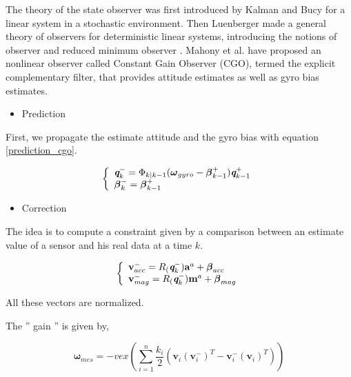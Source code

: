 \documentclass[conference]{IEEEtran}
\begin{document}
The theory of the state observer was first introduced by Kalman and Bucy for a linear system in a stochastic environment. Then Luenberger \cite{david1971introduction} made a general theory of observers for deterministic linear systems, introducing the notions of observer and reduced minimum observer \cite{primbs1996survey}. Mahony et al. \cite{mahony_nonlinear_2008} have proposed an nonlinear observer called Constant Gain Observer (CGO), termed the explicit complementary filter, that provides attitude estimates as well as gyro bias estimates. 

\begin{itemize}
\item Prediction
\end{itemize}

First, we propagate the estimate attitude and the gyro bias with equation \ref{prediction_cgo}.

\begin{equation}
\left\{\begin{array}{l}
\mathbi{q}_{k}^- = \Phi_{k|k-1}(\boldsymbol\omega_{gyro} - \boldsymbol \beta_{k-1}^+)\mathbi{q}_{k-1}^+ \\
\boldsymbol \beta_k^- = \boldsymbol \beta_{k-1}^+
 \end{array}
\right.
\label{prediction_cgo}
\end{equation}


\begin{itemize}
\item Correction
\end{itemize}


The idea is to compute a  constraint  given by a comparison between  an estimate value of a sensor and his real data at a time $k$. 

\begin{equation}
\left\{\begin{array}{l}
\textbf{v}_{acc}^- = R_(\textbf{\em q}_{k}^-)\textbf{a}^a + \boldsymbol  \beta_{acc} \\
\textbf{v}_{mag}^- = R_(\textbf{\em q}_{k}^-)\textbf{m}^a + \boldsymbol  \beta_{mag}
 \end{array}
\right.
\end{equation}

All these vectors are normalized. 

The '' gain '' is given by,

\begin{equation}
\boldsymbol \omega_{mes} = -vex(\sum_{i=1}^n \frac{k_i}{2}(\textbf{v}_i(\textbf{v}_i^-)^T -  \textbf{v}_i^-(\textbf{v}_i)^T )) 
\label{cgo_gain}
\end{equation}
\end{document}
